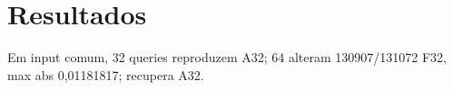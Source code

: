 \section{Resultados}
 Em input comum, 32 queries reproduzem A32; 64 alteram 130907/131072 F32, max abs 0,01181817;  recupera A32. 
